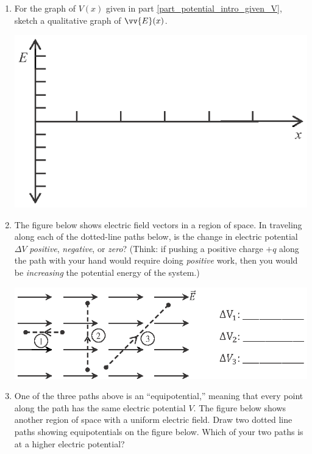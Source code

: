 \begin{enumerate}[wide, label=(\emph{\alph*})]
\item  For the graph of $V(x)$ given in part \ref{part_potential_intro_given_V}, sketch a qualitative graph of $\vv{E}(x)$.
\begin{center}
\includegraphics{potential_intro/activity_5_figs/E_axes.eps}
\end{center}

\pagebreak[2]
\item The figure below shows electric field vectors in a region of space.  In traveling  along each of the dotted-line paths below, is the change in electric potential $\Delta V$ \textit{positive},  \textit{negative}, or  \textit{zero}?  (Think: if pushing a positive charge $+q$ along the path with your hand would require doing \textit{positive} work, then you would  be \textit{increasing} the potential energy of the system.)
\begin{center}
\vspace{-0.1 in}
\includegraphics{potential_intro/activity_5_figs/uniform_E_field_1.eps}
\end{center}

\item  One of the three paths  above is an ``equipotential,'' meaning that every point along the path has the same electric potential $V$.  The figure below shows another region of space with a uniform electric field.  Draw two dotted line paths showing equipotentials on the figure below.  Which of your two paths is at a higher electric potential?


\end{enumerate}
